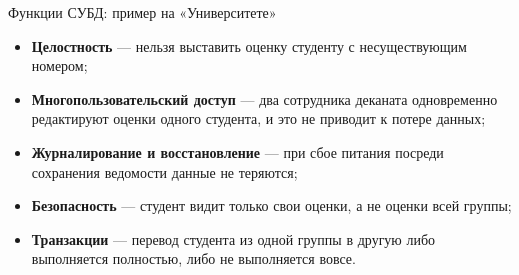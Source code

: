 \documentclass[aspectratio=169]{beamer}
\begin{document}
\begin{frame}{Функции СУБД: пример на «Университете»}

\small
\begin{itemize}
  \item \textbf{Целостность} — нельзя выставить оценку студенту
        с несуществующим номером;
  \item \textbf{Многопользовательский доступ} — два сотрудника
        деканата одновременно редактируют оценки одного
        студента, и это не приводит к потере данных;
  \item \textbf{Журналирование и восстановление} — при сбое
        питания посреди сохранения ведомости данные
        не теряются;
  \item \textbf{Безопасность} — студент видит только свои
        оценки, а не оценки всей группы;
  \item \textbf{Транзакции} — перевод студента из одной группы
        в другую либо выполняется полностью, либо не
        выполняется вовсе.
\end{itemize}

\end{frame}
\end{document}
